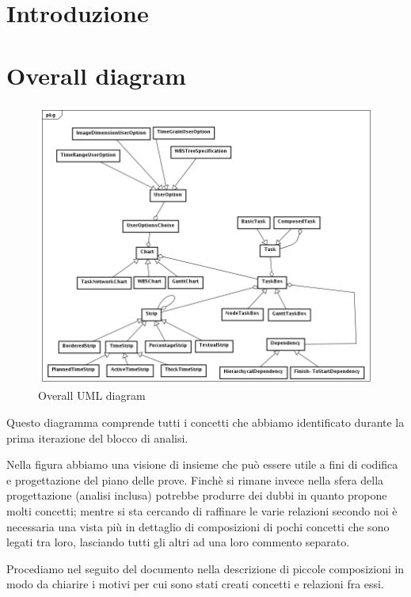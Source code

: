 \documentclass[a4paper, 12pt]{article}
\begin{document}
\newpage

\tableofcontents

\newpage

\section*{Introduzione}

\newpage

\section{Overall diagram}
\begin{figure}[h!] 
	\centering
	\includegraphics[width=1\textwidth]{../DomainModel.png}
	\caption{Overall UML diagram}
	\label{fig:overallDiagram} 
\end{figure}

Questo diagramma comprende tutti i concetti che abbiamo identificato durante la
prima iterazione del blocco di analisi. 

Nella figura abbiamo una visione di insieme che pu\`o essere utile a fini di
codifica e progettazione del piano delle prove. Finch\`e si rimane invece nella
sfera della progettazione (analisi inclusa) potrebbe produrre dei dubbi in
quanto propone molti concetti; mentre si sta cercando di raffinare le varie relazioni
secondo noi \`e necessaria una vista pi\`u in dettaglio di composizioni
di pochi concetti che sono legati tra loro, lasciando tutti gli altri ad una
loro commento separato.

Procediamo nel seguito del documento nella descrizione di piccole composizioni
in modo da chiarire i motivi per cui sono stati creati concetti e relazioni fra
essi.







\end{document}
